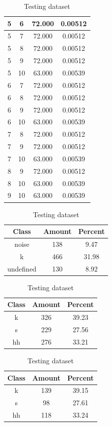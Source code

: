 \begin{table}
\begin{subtable}[tbp]{0.45\textwidth}
{\begin{tabular}{|c|c|c|c|}
 5 & 6 & 72.000 & 0.00512\\ \hline 
 5 & 7 & 72.000 & 0.00512\\ \hline 
 5 & 8 & 72.000 & 0.00512\\ \hline 
 5 & 9 & 72.000 & 0.00512\\ \hline 
 5 & 10 & 63.000 & 0.00539\\ \hline 
 6 & 7 & 72.000 & 0.00512\\ \hline 
 6 & 8 & 72.000 & 0.00512\\ \hline 
 6 & 9 & 72.000 & 0.00512\\ \hline 
 6 & 10 & 63.000 & 0.00539\\ \hline 
 7 & 8 & 72.000 & 0.00512\\ \hline 
 7 & 9 & 72.000 & 0.00512\\ \hline 
 7 & 10 & 63.000 & 0.00539\\ \hline 
 8 & 9 & 72.000 & 0.00512\\ \hline 
 8 & 10 & 63.000 & 0.00539\\ \hline 
 9 & 10 & 63.000 & 0.00539\\ \hline 

\end{tabular}
} \label{xlsskew105}
\caption{xcsskew105}
\end{subtable}

\begin{subtable}[tbp]{0.45\textwidth}
\centering
\begin{tabular}{|c|c|c|}
\hline
Class & Amount & Percent\\ \hline
noise & 138 & 9.47\\ \hline
k & 466 & 31.98\\ \hline
undefined & 130 & 8.92\\ \hline
\end{tabular}
\caption{Entire dataset after stripping short sounds}
\end{subtable}
\hfill
\begin{subtable}[tbp]{0.45\textwidth}
\centering
\begin{tabular}{|c|c|c|}
\hline
Class & Amount & Percent\\ \hline
k & 326 & 39.23\\ \hline
s & 229 & 27.56\\ \hline
hh & 276 & 33.21\\ \hline
\end{tabular}
\caption{Training dataset}
\end{subtable}
\hfill
\begin{subtable}[tbp]{0.45\textwidth}
\centering
\begin{tabular}{|c|c|c|}
\hline
Class & Amount & Percent\\ \hline
k & 139 & 39.15\\ \hline
s & 98 & 27.61\\ \hline
hh & 118 & 33.24\\ \hline
\end{tabular}
\caption{Testing dataset}
\end{subtable}
\hfill


\end{table}
